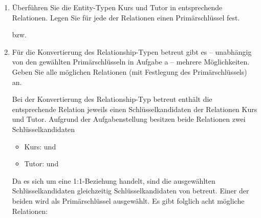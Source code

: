 \documentclass{lehramt-informatik-aufgabe}
\begin{document}
\begin{enumerate}


\item Überführen Sie die Entity-Typen Kurs und Tutor in entsprechende
Relationen. Legen Sie für jede der Relationen einen Primärschlüssel
fest.

\begin{antwort}
\begin{liRmodell}

\end{liRmodell}

bzw.

\begin{liRmodell}

\end{liRmodell}
\end{antwort}


\item Für die Konvertierung des Relationship-Typen betreut gibt es –
unabhängig von den gewählten Primärschlüsseln in Aufgabe a – mehrere
Möglichkeiten. Geben Sie alle möglichen Relationen (mit Festlegung des
Primärschlüssels) an.

\begin{antwort}
Bei der Konvertierung des Relationship-Typ betreut enthält die
ent\-sprech\-ende Relation jeweils einen Schlüsselkandidaten der
Relationen Kurs und Tutor. Aufgrund der Aufgabenstellung besitzen beide
Relationen zwei Schlüsselkandidaten

\begin{itemize}
\item Kurs:  und 
\item Tutor:  und 
\end{itemize}

Da es sich um eine 1:1-Beziehung handelt, sind die ausgewählten
Schlüsselkandidaten gleichzeitig Schlüsselkandidaten von betreut. Einer
der beiden wird als Primärschlüssel ausgewählt. Es gibt folglich acht
mögliche Relationen:

\begin{liRmodell}
\end{liRmodell}
\end{antwort}
\end{enumerate}
\end{document}
